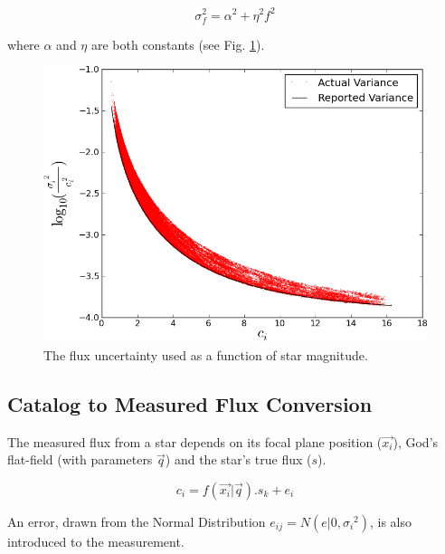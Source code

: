 \documentclass[manuscript]{aastex}
\begin{document}
\begin{displaymath}
\sigma_{{f}}^{2} = \alpha^{2} + \eta^{2} f^{2} 
\end{displaymath}

\noindent{}where $\alpha$ and $\eta$ are both constants (see Fig. \ref{fig:flux_uncertainty}).

\begin{figure}[ht]
\begin{center}
\includegraphics[width=\textwidth]{invvar_plot.png}
\end{center}
\caption{The flux uncertainty used as a function of star magnitude.\label{fig:flux_uncertainty}}
\end{figure}

\subsection{Catalog to Measured Flux Conversion}
The measured flux from a star depends on its focal plane position ($\vec{x_i}$), God's flat-field (with parameters $\vec{q}$) and the star's true flux ($s$). 

\begin{displaymath}
c_i = f(\vec{x_i} | \vec{q}) . s_{k} + e_{i}
\end{displaymath}

\noindent{}An error, drawn from the Normal Distribution $e_{ij} = N(e|0,{\sigma_i}^2)$, is also introduced to the measurement.
\end{document}
